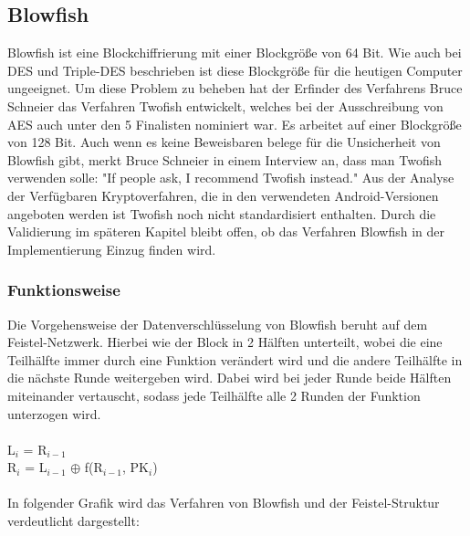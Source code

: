 \documentclass[10pt, a4paper]{scrreprt}
\begin{document}
\subsection{Blowfish}
Blowfish ist eine Blockchiffrierung mit einer Blockgröße von 64 Bit. Wie auch bei DES und Triple-DES beschrieben ist diese Blockgröße für die heutigen Computer ungeeignet. Um diese Problem zu beheben hat der Erfinder des Verfahrens Bruce Schneier das Verfahren Twofish entwickelt, welches bei der Ausschreibung von AES auch unter den 5 Finalisten nominiert war. Es arbeitet auf einer Blockgröße von 128 Bit. Auch wenn es keine Beweisbaren belege für die Unsicherheit von Blowfish gibt, merkt Bruce Schneier in einem Interview an, dass man Twofish verwenden solle: "If people ask, I recommend Twofish instead." %
Aus der Analyse der Verfügbaren Kryptoverfahren, die in den verwendeten Android-Versionen angeboten werden ist Twofish noch nicht standardisiert enthalten. Durch die Validierung im späteren Kapitel bleibt offen, ob das Verfahren Blowfish in der Implementierung Einzug finden wird.

\subsubsection{Funktionsweise}
Die Vorgehensweise der Datenverschlüsselung von Blowfish beruht auf dem Feistel-Netzwerk. Hierbei wie der Block in 2 Hälften unterteilt, wobei die eine Teilhälfte immer durch eine Funktion verändert wird und die andere Teilhälfte in die nächste Runde weitergeben wird. Dabei wird bei jeder Runde beide Hälften miteinander vertauscht, sodass jede Teilhälfte alle 2 Runden der Funktion unterzogen wird. \\ \\
L$_{i}$ = R$_{i-1}$ \\
R$_{i}$ = L$_{i-1}$ $\oplus$ f(R$_{i-1}$, PK$_{i}$) \\ \\
In folgender Grafik wird das Verfahren von Blowfish und der Feistel-Struktur verdeutlicht dargestellt: \\ \\
\end{document}
